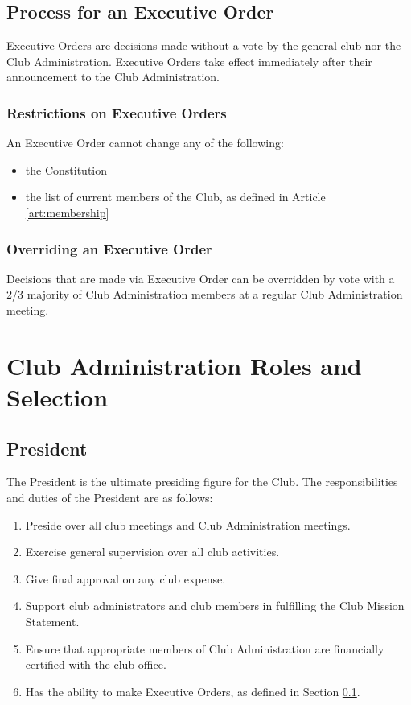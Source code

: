 \documentclass[english,11pt]{article}
\begin{document}
\subsection{Process for an Executive Order} \label{sect:decision:executive-order}
Executive Orders are decisions made without a vote by the general club nor the Club Administration.
Executive Orders take effect immediately after their announcement to the Club Administration.

\subsubsection{Restrictions on Executive Orders} \label{subsect:decision:executive-order:restrictions}
An Executive Order cannot change any of the following:

\begin{itemize}
    \item the Constitution
    \item the list of current members of the Club, as defined in Article \ref{art:membership}
\end{itemize}

\subsubsection{Overriding an Executive Order} \label{subsect:decision:executive-order:override}
Decisions that are made via Executive Order can be overridden by vote with a 2/3 majority of Club Administration members at a regular Club Administration meeting.

\section{Club Administration Roles and Selection} \label{act:cadmin}

\subsection{President} \label{sect:cadmin:president}
The President is the ultimate presiding figure for the Club.
The responsibilities and duties of the President are as follows:

\begin{enumerate}[label=\Alph*.]
    \item Preside over all club meetings and Club Administration meetings.
    \item Exercise general supervision over all club activities.
    \item Give final approval on any club expense.
    \item Support club administrators and club members in fulfilling the Club Mission Statement.
    \item Ensure that appropriate members of Club Administration are financially certified with the club office.
    \item Has the ability to make Executive Orders, as defined in Section \ref{sect:decision:executive-order}.
\end{enumerate}
\end{document}
